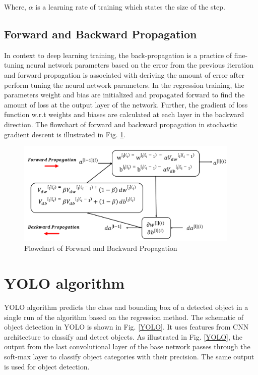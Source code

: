 Where, $\alpha$ is a learning rate of training which states the size of the step. 

\subsection{Forward and Backward Propagation}
In context to deep learning training, the back-propagation is a practice of fine-tuning neural network parameters based on the error from the previous iteration and forward propagation is associated with deriving the amount of error after perform tuning the neural network parameters. In the regression training, the parameters weight and bias are initialized and propagated forward to find the amount of loss at the output layer of the network. Further, the gradient of loss function w.r.t weights and biases are calculated at each layer in the backward direction. The flowchart of forward and backward propagation in stochastic gradient descent is illustrated in Fig. \ref{propogation}.             

\begin{figure}
    \centering
    \includegraphics[width=0.95\textwidth]{Images/propogation.png}
    \caption{Flowchart of Forward and Backward Propagation}
    \label{propogation}
\end{figure} 

\section{YOLO algorithm}
YOLO algorithm predicts the class and bounding box of a detected object in a single run of the algorithm based on the regression method. The schematic of object detection in YOLO is shown in Fig. \ref{YOLO}. It uses features from CNN architecture to classify and detect objects. As illustrated in Fig. \ref{YOLO}, the output from the last convolutional layer of the base network passes through the soft-max layer to classify object categories with their precision. The same output is used for object detection. 

